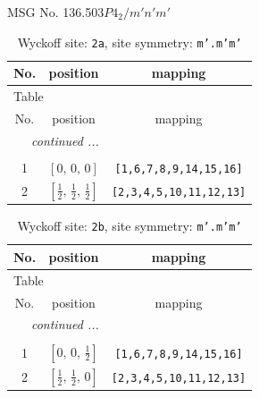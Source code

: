 \documentclass[fleqn,8pt]{jsarticle}
\begin{document}
\setcounter{MaxMatrixCols}{32}

\renewcommand{\tablename}{Table~}
\renewcommand{\figurename}{Figure~}
\begin{center}
\LARGE
MSG No. 136.503\quad$P4_{2}/m'n'm'$
\end{center}
\renewcommand{\arraystretch}{1.2}
\begin{longtable}{ccc}
\caption{Wyckoff site: {\tt 2a}, site symmetry: {\tt m'.m'm'}}
 \\
 \hline \hline
No. & position & mapping \\ \hline \endfirsthead

\multicolumn{2}{l}{\tablename\ \thetable{}} \\
 \hline \hline
No. & position & mapping \\ \hline \endhead

 \hline \hline
\multicolumn{2}{r}{\footnotesize\it continued ...} \\ \endfoot

 \hline \hline
\multicolumn{2}{r}{} \\ \endlastfoot

1 & $\left[ 0,\, 0,\, 0 \right]$ & {\tt [1,6,7,8,9,14,15,16]} \\ \hline
2 & $\left[ \frac{1}{2},\, \frac{1}{2},\, \frac{1}{2} \right]$ & {\tt [2,3,4,5,10,11,12,13]} \\
\end{longtable}
\renewcommand{\arraystretch}{1.2}
\begin{longtable}{ccc}
\caption{Wyckoff site: {\tt 2b}, site symmetry: {\tt m'.m'm'}}
 \\
 \hline \hline
No. & position & mapping \\ \hline \endfirsthead

\multicolumn{2}{l}{\tablename\ \thetable{}} \\
 \hline \hline
No. & position & mapping \\ \hline \endhead

 \hline \hline
\multicolumn{2}{r}{\footnotesize\it continued ...} \\ \endfoot

 \hline \hline
\multicolumn{2}{r}{} \\ \endlastfoot

1 & $\left[ 0,\, 0,\, \frac{1}{2} \right]$ & {\tt [1,6,7,8,9,14,15,16]} \\ \hline
2 & $\left[ \frac{1}{2},\, \frac{1}{2},\, 0 \right]$ & {\tt [2,3,4,5,10,11,12,13]} \\
\end{longtable}
\end{document}
